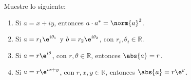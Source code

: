 \documentclass[./../main.tex]{subfiles}
\begin{document}

    \section{}

    Muestre lo siguiente:

    \begin{enumerate}
        \item Si \(a = x + iy\), entonces \(a\cdot a^{*} = \norm{a}^{2}\).
        \item Si \(a = r_{1}\e^{i\theta_{1}}\) y \(b = r_{2}\e^{i\theta_{2}}\), con \(r_{i},\theta_{i}\in\mathbb{R}\).
        \item Si \(a = r\e^{i\theta}\), con \(r, \theta \in \mathbb{R}\), entonces \(\abs{a} = r\).
        \item Si \(a = r\e^{ix + y}\), con \(r, x, y \in \mathbb{R}\), entonces \(\abs{a} = r\e^{y}\).
    \end{enumerate}
\end{document}
